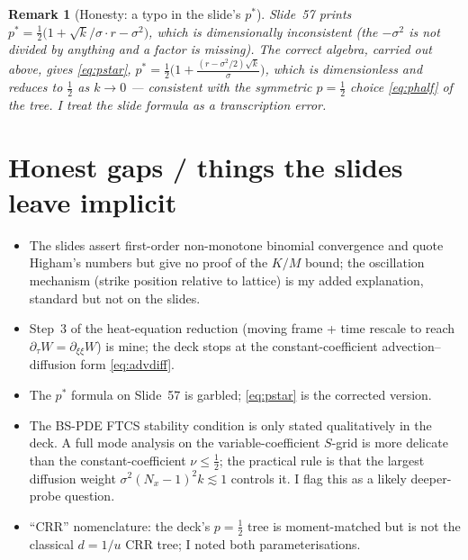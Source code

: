 \documentclass[11pt]{article}
\newtheorem{remark}{Remark}
\begin{document}
\begin{remark}[Honesty: a typo in the slide's $p^\ast$]
Slide~57 prints $p^\ast=\tfrac12\big(1+\sqrt{k}/\sigma\cdot r-\sigma^2\big)$, which is dimensionally inconsistent (the $-\sigma^2$ is not divided by anything and a factor is missing). The correct algebra, carried out above, gives \eqref{eq:pstar}, $p^\ast=\tfrac12\big(1+\tfrac{(r-\sigma^2/2)\sqrt k}{\sigma}\big)$, which is dimensionless and reduces to $\tfrac12$ as $k\to0$ --- consistent with the symmetric $p=\tfrac12$ choice \eqref{eq:phalf} of the tree. I treat the slide formula as a transcription error.
\end{remark}

\section*{Honest gaps / things the slides leave implicit}
\begin{itemize}[leftmargin=1.4em]
\item The slides assert first-order non-monotone binomial convergence and quote Higham's numbers but give no proof of the $K/M$ bound; the oscillation mechanism (strike position relative to lattice) is my added explanation, standard but not on the slides.
\item Step~3 of the heat-equation reduction (moving frame + time rescale to reach $\partial_\tau W=\partial_{\xi\xi}W$) is mine; the deck stops at the constant-coefficient advection--diffusion form \eqref{eq:advdiff}.
\item The $p^\ast$ formula on Slide~57 is garbled; \eqref{eq:pstar} is the corrected version.
\item The BS-PDE FTCS stability condition is only stated qualitatively in the deck. A full mode analysis on the variable-coefficient $S$-grid is more delicate than the constant-coefficient $\nu\le\tfrac12$; the practical rule is that the largest diffusion weight $\sigma^2 (N_x-1)^2 k \lesssim 1$ controls it. I flag this as a likely deeper-probe question.
\item ``CRR'' nomenclature: the deck's $p=\tfrac12$ tree is moment-matched but is not the classical $d=1/u$ CRR tree; I noted both parameterisations.
\end{itemize}
\end{document}
